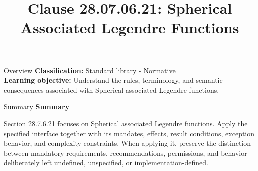 \documentclass[10pt,letterpaper]{article}
\title{Clause 28.07.06.21: Spherical Associated Legendre Functions}
\author{}
\date{}
\begin{document}
\maketitle
\begin{CornellOverviewBox}{Overview}
\textbf{Classification:} Standard library - Normative\\[2pt]
\textbf{Learning objective:} Understand the rules, terminology, and semantic consequences associated with Spherical associated Legendre functions.
\end{CornellOverviewBox}\begin{CornellSummaryBox}{Summary}
{\sffamily\bfseries\color{Accent} Summary}\par\vspace{3pt}Section 28.7.6.21 focuses on Spherical associated Legendre functions. Apply the specified interface together with its mandates, effects, result conditions, exception behavior, and complexity constraints. When applying it, preserve the distinction between mandatory requirements, recommendations, permissions, and behavior deliberately left undefined, unspecified, or implementation-defined.
\end{CornellSummaryBox}
\end{document}
